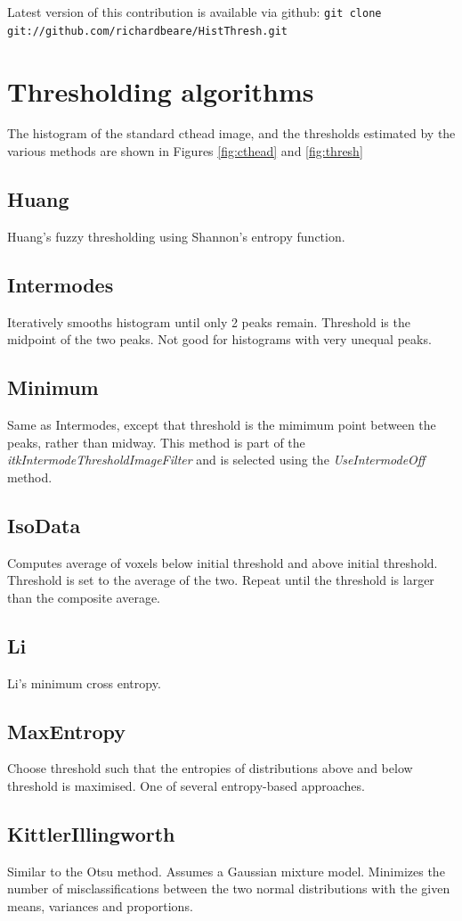 \documentclass{InsightArticle}
\begin{document}
Latest version of this contribution is available via github:
{\tt git clone git://github.com/richardbeare/HistThresh.git}

\section{Thresholding algorithms}
The histogram of the standard cthead image, and the thresholds
estimated by the various methods are shown in Figures \ref{fig:cthead}
and \ref{fig:thresh}
\subsection{Huang}
Huang's fuzzy thresholding using Shannon's entropy function.
\subsection{Intermodes}
Iteratively smooths histogram until only 2 peaks remain. Threshold is
the midpoint of the two peaks. Not good for histograms with very
unequal peaks.
\subsection{Minimum}
Same as Intermodes, except that threshold is the mimimum point between
the peaks, rather than midway. This method is part of the {\em
  itkIntermodeThresholdImageFilter} and is selected using the
{\em UseIntermodeOff} method.
\subsection{IsoData}
Computes average of voxels below initial threshold and above initial
threshold. Threshold is set to the average of the two. Repeat until
the threshold is larger than the composite average.

\subsection{Li}
Li's minimum cross entropy.
\subsection{MaxEntropy}
Choose threshold such that the entropies of distributions above and
below threshold is maximised. One of several entropy-based approaches.

\subsection{KittlerIllingworth}
Similar to the Otsu method. Assumes a Gaussian mixture
model. Minimizes the number of misclassifications between the two
normal distributions with the given means, variances and proportions.
\end{document}
